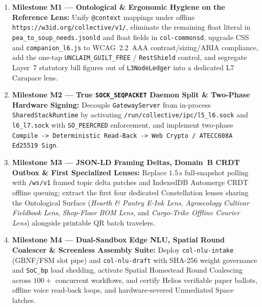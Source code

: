 \begin{enumerate}
    \item \textbf{Milestone M1 --- Ontological \& Ergonomic Hygiene on the Reference Lens:} Unify \texttt{@context} mappings under offline \texttt{https://w3id.org/collective/v1/}, eliminate the remaining float literal in \texttt{pea\_to\_soup\_needs.jsonld} and float fields in \texttt{col-commonsd}, upgrade CSS and \texttt{companion\_l6.js} to WCAG~2.2~AAA contrast/sizing/ARIA compliance, add the one-tap \texttt{UNCLAIM\_GUILT\_FREE} / \texttt{RestShield} control, and segregate Layer~7 statutory bill figures out of \texttt{L3NodeLedger} into a dedicated L7 Carapace lens.
    \item \textbf{Milestone M2 --- True \texttt{SOCK\_SEQPACKET} Daemon Split \& Two-Phase Hardware Signing:} Decouple \texttt{GatewayServer} from in-process \texttt{SharedStackRuntime} by activating \texttt{/run/collective/ipc/l5\_l6.sock} and \texttt{l6\_l7.sock} with \texttt{SO\_PEERCRED} enforcement, and implement two-phase \texttt{Compile -> Deterministic Read-Back -> Web Crypto / ATECC608A Ed25519 Sign}.
    \item \textbf{Milestone M3 --- JSON-LD Framing Deltas, Domain~B CRDT Outbox \& First Specialized Lenses:} Replace $1.5\,\mathrm{s}$ full-snapshot polling with \texttt{/ws/v1} framed topic delta patches and IndexedDB Automerge CRDT offline queuing; extract the first four dedicated Constellation lenses sharing the Ontological Surface (\textit{Hearth \& Pantry E-Ink Lens}, \textit{Agroecology Cultivar Fieldbook Lens}, \textit{Shop-Floor BOM Lens}, and \textit{Cargo-Trike Offline Courier Lens}) alongside printable QR batch travelers.
    \item \textbf{Milestone M4 --- Dual-Sandbox Edge NLU, Spatial Round Coalescer \& Screenless Assembly Suite:} Deploy \texttt{col-nlu-intake} (GBNF/FSM slot pipe) and \texttt{col-nlu-draft} with SHA-256 weight governance and \texttt{SoC\_bp} load shedding, activate Spatial Homestead Round Coalescing across $100+$ concurrent workflows, and certify Helios verifiable paper ballots, offline voice read-back loops, and hardware-severed Unmediated Space latches.
\end{enumerate}

